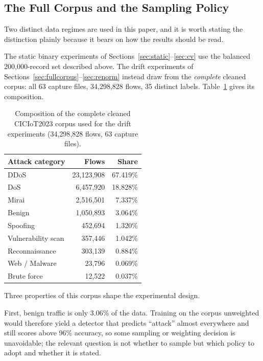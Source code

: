 \documentclass[11pt,a4paper]{article}
\begin{document}
\subsection{The Full Corpus and the Sampling Policy}
\label{sec:corpus}

Two distinct data regimes are used in this paper, and it is worth stating the
distinction plainly because it bears on how the results should be read.

The static binary experiments of
Sections~\ref{sec:static}--\ref{sec:cv} use the balanced 200{,}000-record set
described above. The drift experiments of
Sections~\ref{sec:fullcorpus}--\ref{sec:renorm} instead draw from the
\emph{complete} cleaned corpus: all 63 capture files, 34{,}298{,}828 flows,
35 distinct labels. Table~\ref{tab:corpus} gives its composition.

\begin{table}[!ht]
\centering
\caption{Composition of the complete cleaned CICIoT2023 corpus used for the
drift experiments (34{,}298{,}828 flows, 63 capture files).}
\label{tab:corpus}
\small
\begin{tabular}{lrr}
\toprule
\textbf{Attack category} & \textbf{Flows} & \textbf{Share} \\
\midrule
DDoS               & 23{,}123{,}908 & 67.419\% \\
DoS                &  6{,}457{,}920 & 18.828\% \\
Mirai              &  2{,}516{,}501 &  7.337\% \\
Benign             &  1{,}050{,}893 &  3.064\% \\
Spoofing           &    452{,}694 &  1.320\% \\
Vulnerability scan &    357{,}446 &  1.042\% \\
Reconnaissance     &    303{,}139 &  0.884\% \\
Web / Malware      &     23{,}796 &  0.069\% \\
Brute force        &     12{,}522 &  0.037\% \\
\bottomrule
\end{tabular}
\end{table}

Three properties of this corpus shape the experimental design.

First, benign traffic is only 3.06\% of the data. Training on the corpus
unweighted would therefore yield a detector that predicts ``attack'' almost
everywhere and still scores above 96\% accuracy, so some sampling or weighting
decision is unavoidable; the relevant question is not whether to sample but
which policy to adopt and whether it is stated.
\end{document}
